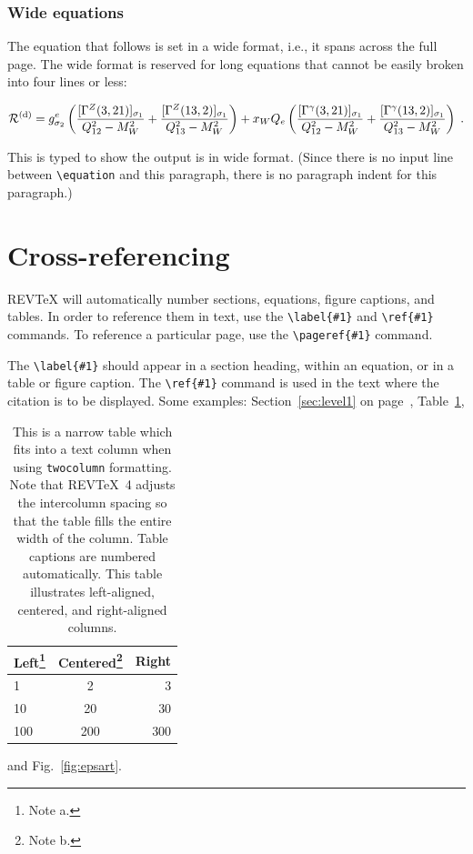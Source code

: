 \documentclass[%
 aapm,
 mph,%
 amsmath,amssymb,
 reprint,%
]{revtex4-2}
\begin{document}
\subsubsection{Wide equations}
The equation that follows is set in a wide format, i.e., it spans
across the full page. The wide format is reserved for long equations
that cannot be easily broken into four lines or less:
\begin{widetext}
\begin{equation}
{\cal R}^{(\text{d})}=
 g_{\sigma_2}^e
 \left(
   \frac{[\Gamma^Z(3,21)]_{\sigma_1}}{Q_{12}^2-M_W^2}
  +\frac{[\Gamma^Z(13,2)]_{\sigma_1}}{Q_{13}^2-M_W^2}
 \right)
 + x_WQ_e
 \left(
   \frac{[\Gamma^\gamma(3,21)]_{\sigma_1}}{Q_{12}^2-M_W^2}
  +\frac{[\Gamma^\gamma(13,2)]_{\sigma_1}}{Q_{13}^2-M_W^2}
 \right)\;. \label{eq:wideeq}
\end{equation}
\end{widetext}
This is typed to show the output is in wide format.
(Since there is no input line between \verb+\equation+ and
this paragraph, there is no paragraph indent for this paragraph.)
\section{Cross-referencing}
REV\TeX{} will automatically number sections, equations, figure
captions, and tables. In order to reference them in text, use the
\verb+\label{#1}+ and \verb+\ref{#1}+ commands. To reference a
particular page, use the \verb+\pageref{#1}+ command.

The \verb+\label{#1}+ should appear in a section heading, within an
equation, or in a table or figure caption. The \verb+\ref{#1}+ command
is used in the text where the citation is to be displayed.  Some
examples: Section~\ref{sec:level1} on page~\pageref{sec:level1},
Table~\ref{tab:table1},%
\begin{table}
\caption{\label{tab:table1}This is a narrow table which fits into a
text column when using \texttt{twocolumn} formatting. Note that
REV\TeX~4 adjusts the intercolumn spacing so that the table fills the
entire width of the column. Table captions are numbered
automatically. This table illustrates left-aligned, centered, and
right-aligned columns.  }
\begin{ruledtabular}
\begin{tabular}{lcr}
Left\footnote{Note a.}&Centered\footnote{Note b.}&Right\\
\hline
1 & 2 & 3\\
10 & 20 & 30\\
100 & 200 & 300\\
\end{tabular}
\end{ruledtabular}
\end{table}
and Fig.~\ref{fig:epsart}.
\end{document}
